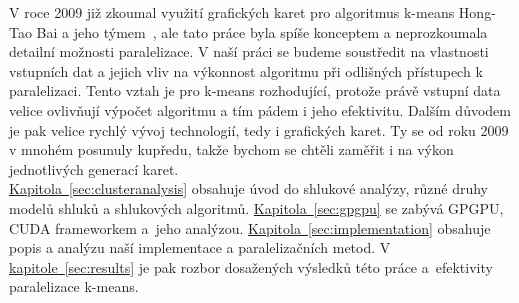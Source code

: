 V roce 2009 již zkoumal využití grafických karet pro algoritmus k-means Hong-Tao Bai a jeho týmem~\cite{Hong09}, ale tato práce byla spíše konceptem a neprozkoumala detailní možnosti paralelizace.
V naší práci se budeme soustředit na vlastnosti vstupních dat a jejich vliv na výkonnost algoritmu při odlišných přístupech k paralelizaci. Tento vztah je pro k-means rozhodující, protože právě vstupní data velice ovlivňují výpočet algoritmu a tím pádem i jeho efektivitu.
Dalším důvodem je pak velice rychlý vývoj technologií, tedy i grafických karet. Ty se od roku 2009 v mnohém posunuly kupředu, takže bychom se chtěli zaměřit i na výkon jednotlivých generací karet.\\

\hyperref[sec:clusteranalysis]{Kapitola~\ref*{sec:clusteranalysis}} obsahuje úvod do shlukové analýzy, různé druhy modelů shluků a shlukových algoritmů. \hyperref[sec:gpgpu]{Kapitola~\ref*{sec:gpgpu}} se zabývá GPGPU, CUDA frameworkem a~jeho analýzou. \hyperref[sec:implementation]{Kapitola~\ref*{sec:implementation}} obsahuje popis a analýzu naší implementace a paralelizačních metod. V \hyperref[sec:results]{kapitole~\ref*{sec:results}} je pak rozbor dosažených výsledků této práce a~efektivity paralelizace k-means.